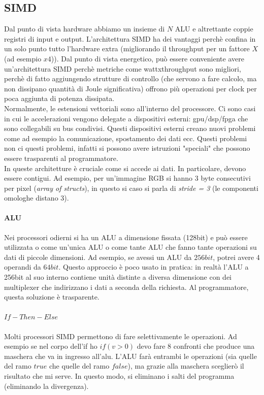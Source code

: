 \documentclass{article}
\begin{document}
\subsection{SIMD}Dal punto di vista hardware abbiamo un insieme di $N$ ALU e altrettante coppie registri di input e output. L'architettura SIMD ha dei vantaggi perchè confina in un solo punto tutto l'hardware extra (migliorando il throughput per un fattore $X$ (ad esempio $x4$)). Dal punto di vista energetico, può essere conveniente avere un'architettura SIMD perchè metriche come wattxthroughput sono migliori, perchè di fatto aggiungendo strutture di controllo (che servono a fare calcolo, ma non dissipano quantità di Joule significativa) offrono più operazioni per clock per poca aggiunta di potenza dissipata.\\
Normalmente, le estensioni vettoriali sono all'interno del processore. Ci sono casi in cui le accelerazioni vengono delegate a dispositivi esterni: gpu/dsp/fpga che sono collegabili su bus condivisi. Questi dispositivi esterni creano nuovi problemi come ad esempio la comunicazione, spostamento dei dati ecc. Questi problemi non ci questi problemi, infatti si possono avere istruzioni "speciali" che possono essere trasparenti al programmatore.\\
In queste architetture è cruciale come si accede ai dati. In particolare, devono essere contigui. Ad esempio, per un'immagine RGB si hanno 3 byte consecutivi per pixel (\textit{array of structs}), in questo si caso si parla di \textit{stride = 3} (le componenti omologhe distano $3$).

\paragraph{ALU}
Nei processori odierni si ha un ALU a dimensione fissata (128bit)
e può essere utilizzata o come un'unica ALU o come tante ALU che fanno tante operazioni su dati di piccole dimensioni. Ad esempio, se avessi un ALU da $256bit$, potrei avere 4 operandi da $64bit$. Questo approccio è poco usato in pratica: in realtà l'ALU a 256bit al suo interno contiene unità distinte a diversa dimensione con dei multiplexer che indirizzano i dati a seconda della richiesta. Al programmatore, questa soluzione è trasparente.

\paragraph{$If-Then-Else$}
Molti processori SIMD permettono di fare selettivamente le operazioni. Ad esempio se nel corpo dell'if ho $if (v > 0)$ devo fare $8$ confronti che produce una maschera che va in ingresso all'alu. L'ALU farà entrambi le operazioni (sia quelle del ramo $true$ che quelle del ramo $false$), ma grazie alla maschera sceglierò il risultato che mi serve. In questo modo, si eliminano i salti del programma (eliminando la divergenza).
\end{document}
